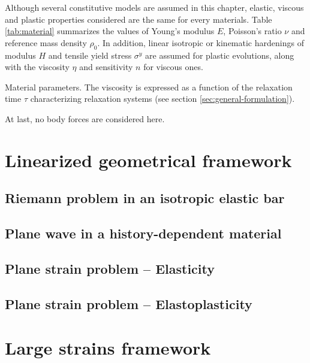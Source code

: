 Although several constitutive models are assumed in this chapter, elastic, viscous and plastic properties considered are the same for every materials. Table \ref{tab:material} summarizes the values of Young's modulus $E$, Poisson's ratio $\nu$ and reference mass density $\rho_0$.
In addition, linear isotropic or kinematic hardenings of modulus $H$ and tensile yield stress $\sigma^y$ are assumed for plastic evolutions, along with the viscosity $\eta$ and sensitivity $n$ for viscous ones.
\begin{table}[h!]
  \centering
  
  \caption{Material parameters. The viscosity is expressed as a function of the relaxation time $\tau$ characterizing relaxation systems (see section \ref{sec:general-formulation}).}
  \label{tab:material}
\end{table}
At last, no body forces are considered here.
\section{Linearized geometrical framework}
\label{sec:hpp_simulations}

\subsection{Riemann problem in an isotropic elastic bar}
\label{subsec:hpp_bar}


\subsection{Plane wave in a history-dependent material}
\label{subsec:hpp_planewave}


\subsection{Plane strain problem -- Elasticity}
\label{subsec:el_planestrain}


\subsection{Plane strain problem -- Elastoplasticity}
\label{subsec:ep_planestrain}


\section{Large strains framework}
\label{sec:he_simulations}
